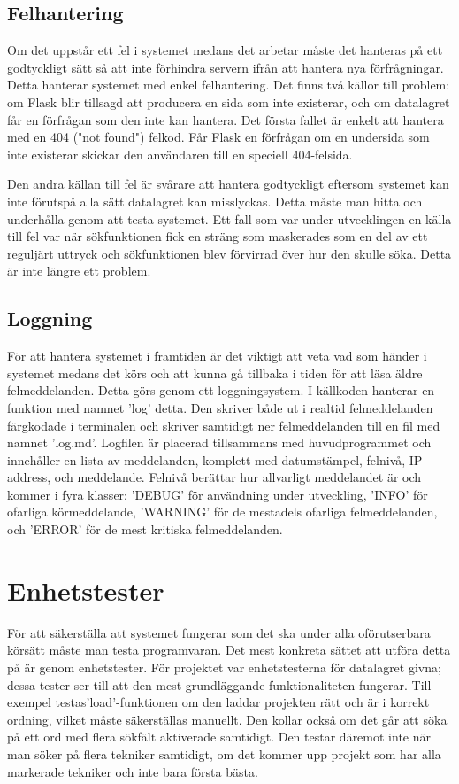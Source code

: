 \documentclass{liu_mall}
\begin{document}
        \subsection{Felhantering}
            Om det uppstår ett fel i systemet medans det arbetar måste det hanteras på ett godtyckligt sätt så att inte förhindra servern ifrån att hantera nya förfrågningar. Detta hanterar systemet med enkel felhantering. Det finns två källor till problem: om Flask blir tillsagd att producera en sida som inte existerar, och om datalagret får en förfrågan som den inte kan hantera. Det första fallet är enkelt att hantera med en 404 ("not found") felkod. Får Flask en förfrågan om en undersida som inte existerar skickar den användaren till en speciell 404-felsida.
    
            Den andra källan till fel är svårare att hantera godtyckligt eftersom systemet kan inte förutspå alla sätt datalagret kan misslyckas. Detta måste man hitta och underhålla genom att testa systemet. Ett fall som var under utvecklingen en källa till fel var när sökfunktionen fick en sträng som maskerades som en del av ett reguljärt uttryck och sökfunktionen blev förvirrad över hur den skulle söka. Detta är inte längre ett problem.

        \subsection{Loggning}
            För att hantera systemet i framtiden är det viktigt att veta vad som händer i systemet medans det körs och att kunna gå tillbaka i tiden för att läsa äldre felmeddelanden. Detta görs genom ett loggningsystem. I källkoden hanterar en funktion med namnet 'log' detta. Den skriver både ut i realtid felmeddelanden färgkodade i terminalen och skriver samtidigt ner felmeddelanden till en fil med namnet 'log.md'. Logfilen är placerad tillsammans med huvudprogrammet och innehåller en lista av meddelanden, komplett med datumstämpel, felnivå, IP-address, och meddelande. Felnivå berättar hur allvarligt meddelandet är och kommer i fyra klasser: 'DEBUG' för användning under utveckling, 'INFO' för ofarliga körmeddelande, 'WARNING' för de mestadels ofarliga felmeddelanden, och 'ERROR' för de mest kritiska felmeddelanden.

    \section{Enhetstester}
        För att säkerställa att systemet fungerar som det ska under alla oförutserbara körsätt måste man testa programvaran. Det mest konkreta sättet att utföra detta på är genom enhetstester. För projektet var enhetstesterna för datalagret givna; dessa tester ser till att den mest grundläggande funktionaliteten fungerar. Till exempel testas'load'-funktionen om den laddar projekten rätt och är i korrekt ordning, vilket måste säkerställas manuellt. Den kollar också om det går att söka på ett ord med flera sökfält aktiverade samtidigt. Den testar däremot inte när man söker på flera tekniker samtidigt, om det kommer upp projekt som har alla markerade tekniker och inte bara första bästa.
\end{document}

